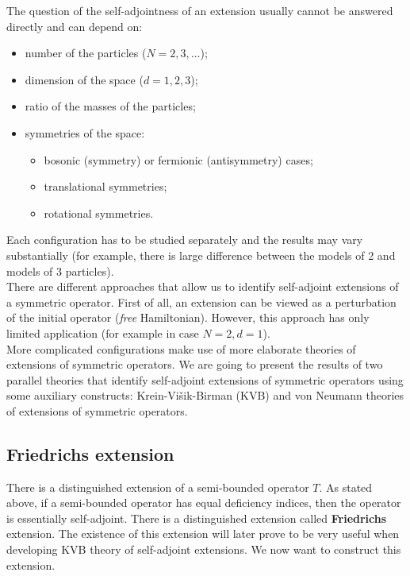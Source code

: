 \documentclass[11pt, a4paper, german]{article}
\theoremstyle{plain}
\theoremstyle{definition}
\theoremstyle{remark}
\numberwithin{equation}{section}
\numberwithin{theorem}{section}
\begin{document}
The question of the self-adjointness of an extension usually cannot be answered directly and can depend on:

\begin{itemize}
\item number of the particles ($N=2, 3, \dots$);
\item dimension of the space ($d=1,2,3$);
\item ratio of the masses of the particles;
\item symmetries of the space:
\begin{itemize}
\item bosonic (symmetry) or fermionic (antisymmetry) cases;
\item translational symmetries;
\item rotational symmetries.
\end{itemize}
\end{itemize}

Each configuration has to be studied separately and the results may vary substantially (for example, there is large difference between the models of 2 and models of 3 particles).\\

There are different approaches that allow us to identify self-adjoint extensions of a symmetric operator. First of all, an extension can be viewed as a perturbation of the initial operator (\textit{free} Hamiltonian). However, this approach has only limited application (for example in case $N=2, d=1$).\\

More complicated configurations make use of more elaborate theories of extensions of symmetric operators. We are going to present the results of two parallel theories that identify self-adjoint extensions of symmetric operators using some auxiliary constructs: Krein-Višik-Birman (KVB) and von Neumann theories of extensions of symmetric operators.

\subsection{Friedrichs extension}

There is a distinguished extension of a semi-bounded operator $T$. As stated above, if a semi-bounded operator has equal deficiency indices, then the operator is essentially self-adjoint. There is a distinguished extension called \textbf{Friedrichs} extension. The existence of this extension will later prove to be very useful when developing KVB theory of self-adjoint extensions. We now want to construct this extension.
\end{document}

